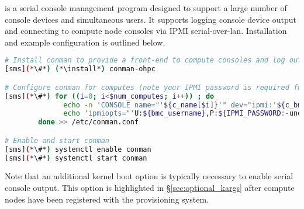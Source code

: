 \conman{} is a serial console management program designed to support a large
number of console devices and simultaneous users. It supports logging console
device output and connecting to compute node consoles via IPMI
serial-over-lan. Installation and example configuration is outlined below.

\begin{lstlisting}[language=bash,keywords={},upquote=true]
# Install conman to provide a front-end to compute consoles and log output
[sms](*\#*) (*\install*) conman-ohpc

# Configure conman for computes (note your IPMI password is required for console access)
[sms](*\#*) for ((i=0; i<$num_computes; i++)) ; do
              echo -n 'CONSOLE name="'${c_name[$i]}'" dev="ipmi:'${c_bmc[$i]}'" '
              echo 'ipmiopts="'U:${bmc_username},P:${IPMI_PASSWORD:-undefined},W:solpayloadsize'"'
        done >> /etc/conman.conf

# Enable and start conman
[sms](*\#*) systemctl enable conman
[sms](*\#*) systemctl start conman
\end{lstlisting}

\noindent Note that an additional kernel boot option is typically necessary to
enable serial console output. This option is highlighted in \S\ref{sec:optional_kargs} after
compute nodes have been registered with the provisioning system.
\fi


